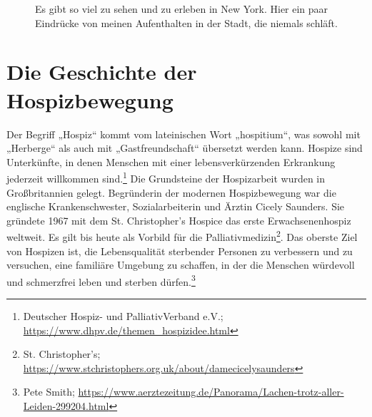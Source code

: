 \documentclass[fontsize=14pt,a4paper,headinclude,DIV=calc,automark]{scrbook}
\begin{document}
\setlength{\fboxsep}{0pt}    %
\setlength{\fboxrule}{0.2pt} %
\begin{figure}[ht]
    \raggedright
    \caption{Es gibt so viel zu sehen und zu erleben in New York. Hier ein paar Eindrücke von meinen Aufenthalten in der Stadt, die niemals schläft.}
    \label{fig:new_york_collection}
\end{figure}

\thispagestyle{scrheadings} %
\leavevmode
\normalsize

\section{Die Geschichte der Hospizbewegung}

Der Begriff „Hospiz“ kommt vom lateinischen Wort „hospitium“, was sowohl mit „Herberge“ als auch mit „Gastfreundschaft“ übersetzt werden kann. Hospize sind Unterkünfte, in denen Menschen mit einer lebensverkürzenden Erkrankung jederzeit willkommen sind.\footnote{Deutscher Hospiz- und PalliativVerband e.V.; \url{https://www.dhpv.de/themen_hospizidee.html}} Die Grundsteine der Hospizarbeit wurden in Großbritannien gelegt. Begründerin der modernen Hospizbewegung war die englische Krankenschwester, Sozialarbeiterin und Ärztin Cicely Saunders. Sie gründete 1967 mit dem St. Christopher’s Hospice das erste Erwachsenenhospiz weltweit. Es gilt bis heute als Vorbild für die Palliativmedizin\footnote{St. Christopher’s; \url{https://www.stchristophers.org.uk/about/damecicelysaunders}}. Das oberste Ziel von Hospizen ist, die Lebensqualität sterbender Personen zu verbessern und zu versuchen, eine familiäre Umgebung zu schaffen, in der die Menschen würdevoll und schmerzfrei leben und sterben dürfen.\footnote{Pete Smith; \url{https://www.aerztezeitung.de/Panorama/Lachen-trotz-aller-Leiden-299204.html}}
\end{document}
